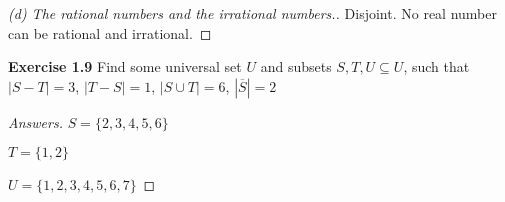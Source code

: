 \documentclass[12pt,oneside]{article}
\newenvironment{exercise}[1]{\vspace{.1in}\noindent\textbf{Exercise #1 \hspace{.05em}}}{}
\begin{document}
\begin{proof}[(d) The rational numbers and the irrational numbers.]

\item Disjoint. No real number can be rational and irrational.

\end{proof}



\begin{exercise}{1.9}
Find some universal set $U$ and subsets $S,T,U \subseteq U$, such that $|S-T| = 3$, $|T-S| = 1$, $|S \cup T| = 6$, $|\overline{S}| = 2$
\end{exercise}

\begin{proof}[Answers]

\item$S=\{2,3,4,5,6\}$
\item$T= \{1,2\}$
\item$U=\{1,2,3,4,5,6,7\}$

\end{proof}


\end{document}
